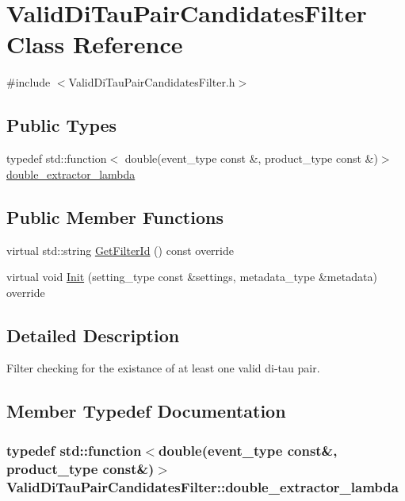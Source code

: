 \hypertarget{classValidDiTauPairCandidatesFilter}{
\section{ValidDiTauPairCandidatesFilter Class Reference}
\label{classValidDiTauPairCandidatesFilter}
}


{\ttfamily \#include $<$ValidDiTauPairCandidatesFilter.h$>$}\subsection*{Public Types}
\begin{DoxyCompactItemize}
\item 
typedef std::function$<$ double(event\_\-type const \&, product\_\-type const \&)$>$ \hyperlink{classValidDiTauPairCandidatesFilter_a8e8a290e397e61df9bd8e8b120aa1a36}{double\_\-extractor\_\-lambda}
\end{DoxyCompactItemize}
\subsection*{Public Member Functions}
\begin{DoxyCompactItemize}
\item 
virtual std::string \hyperlink{classValidDiTauPairCandidatesFilter_ad28fb9f4f71e20fd002c2d0da938256b}{GetFilterId} () const override
\item 
virtual void \hyperlink{classValidDiTauPairCandidatesFilter_a6594e03edb7fd0ef62e96947ab89f4a2}{Init} (setting\_\-type const \&settings, metadata\_\-type \&metadata) override
\end{DoxyCompactItemize}


\subsection{Detailed Description}
Filter checking for the existance of at least one valid di-\/tau pair. 

\subsection{Member Typedef Documentation}
\hypertarget{classValidDiTauPairCandidatesFilter_a8e8a290e397e61df9bd8e8b120aa1a36}{
\subsubsection[{double\_\-extractor\_\-lambda}]{\setlength{\rightskip}{0pt plus 5cm}typedef std::function$<$double(event\_\-type const\&, product\_\-type const\&)$>$ {\bf ValidDiTauPairCandidatesFilter::double\_\-extractor\_\-lambda}}}
\label{classValidDiTauPairCandidatesFilter_a8e8a290e397e61df9bd8e8b120aa1a36}


